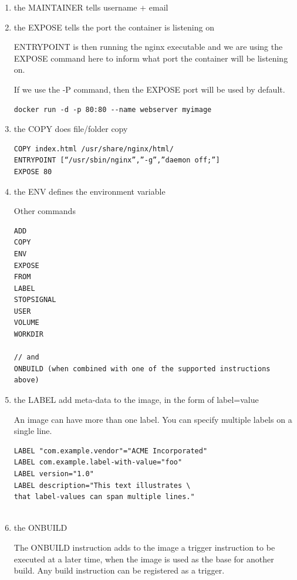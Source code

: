 \begin{enumerate}
  
  
  \item the MAINTAINER tells username + email

  \item the EXPOSE tells the port the container is listening on
  
ENTRYPOINT is then running the nginx executable and we are using the EXPOSE
command here to inform what port the container will be listening on.

If we use the -P command, then the EXPOSE port will be used by default.

\begin{verbatim}
docker run -d -p 80:80 --name webserver myimage
\end{verbatim}

  \item the COPY does file/folder copy
  
\begin{verbatim}
COPY index.html /usr/share/nginx/html/
ENTRYPOINT [“/usr/sbin/nginx”,”-g”,”daemon off;”]
EXPOSE 80
\end{verbatim}

  \item the ENV defines the environment variable

Other commands
\begin{verbatim}
ADD
COPY
ENV
EXPOSE
FROM
LABEL
STOPSIGNAL
USER
VOLUME
WORKDIR

// and
ONBUILD (when combined with one of the supported instructions above)
\end{verbatim}



   \item the LABEL add meta-data to the image, in the form of label=value
   
An image can have more than one label. You can specify multiple labels on a single line. 
\begin{verbatim}
LABEL "com.example.vendor"="ACME Incorporated"
LABEL com.example.label-with-value="foo"
LABEL version="1.0"
LABEL description="This text illustrates \
that label-values can span multiple lines."


\end{verbatim}

   \item the ONBUILD
   
The ONBUILD instruction adds to the image a trigger instruction to be executed
at a later time, when the image is used as the base for another build.
Any build instruction can be registered as a trigger.


\end{enumerate}



